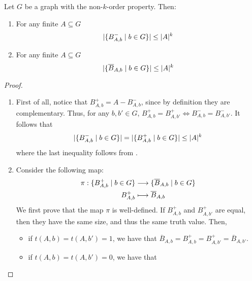     \begin{corollary}[Claim 2.6.1] \label{cor:k_order_propery_bounds_BAbs}
        Let $G$ be a graph with the non-$k$-order property.
        Then:
        \begin{enumerate}
            \item\label{itm:k_order_propery_bounds_BAbs.1} For any finite $A \subseteq G$
                \[
                    | \{ B^-_{A,b} \mid b \in G \} |
                        \leq |A|^k
                \]
            \item\label{itm:k_order_propery_bounds_BAbs.2} For any finite $A \subseteq G$
                \[
                    | \{ \overline{B}_{A,b} \mid b \in G \} |
                        \leq |A|^k
                \]
        \end{enumerate}
        \begin{proof}
            \begin{enumerate}
                \item First of all, notice that $B^+_{A,b} = A - B^-_{A,b}$, since by definition they are complementary.
                    Thus, for any $b, b' \in G$, $B^+_{A,b} = B^+_{A,b'} \Leftrightarrow B^-_{A,b} = B^-_{A,b'}$.
                    It follows that
                    \[
                        | \{ B^-_{A,b} \mid b \in G \} | =
                        | \{ B^+_{A,b} \mid b \in G \} | \leq |A|^k
                    \]
                    where the last inequality follows from .
                \item Consider the following map:
                    \begin{align*}
                        \pi: \{ B^+_{A,b} \mid b \in G \} & \longrightarrow \{ \overline{B}_{A,b} \mid b \in G \} \\
                                                     B^+_{A,b} & \longmapsto \overline{B}_{A,b}
                    \end{align*}
                    We first prove that the map $\pi$ is well-defined.
                    If $B^+_{A,b}$ and $B^+_{A,b'}$ are equal, then they have the same size, and thus the same truth value.
                    Then,
                    \begin{itemize}
                        \item if $t(A,b) = t(A,b') = 1$, we have that $\overline{B}_{A,b} = B^+_{A,b} = B^+_{A,b'} = \overline{B}_{A,b'}$.
                        \item if $t(A,b) = t(A,b') = 0$, we have that

\end{itemize}
\end{enumerate}
\end{proof}
\end{corollary}

